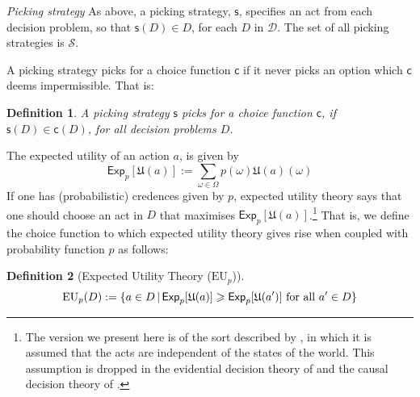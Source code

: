 \documentclass[a4paper]{article}
\newtheorem{definition}{Definition}
\newcommand\A{\mathcal{A}}
\newcommand\D{\mathcal{D}}
\renewcommand\S{\mathcal{S}}
\newcommand\s{\mathsf{s}}
\renewcommand\c{\mathsf{c}} %
\newcommand\Exp{\mathsf{Exp}}
\newcommand\EU{\mathrm{EU}}
\newcommand\U{\mathfrak{U}} %
\newcommand{\todoinfo}[2][]{\todo[backgroundcolor=orange!80,bordercolor=black,linecolor=gray!80, #1,inline,caption={}]{#2}}
\newcommand\SetDelimiter[1][]{
	\nonscript\,#1\vert \allowbreak \nonscript\,\mathopen{}}
\providecommand\given{\SetDelimiter}
\renewcommand{\emptyset}{\varnothing}
\renewcommand{\geq}{\geqslant}
\newenvironment{CCM rewritten}
{\begingroup\color{blue}} %
{\endgroup}              %
\begin{document}
\emph{Picking strategy } As above, a picking strategy, $\s$, specifies an act from each decision problem, so that $\s(D)\in D$, for each $D$ in $\D$. The set of all picking strategies is $\S$. 

A picking strategy picks for a choice function $\c$ if it never picks an option which $\c$ deems impermissible. That is: 
\begin{definition}
	A picking strategy $\s$ \emph{picks for a choice function} $\c$, if $\s(D) \in \c(D)$, for all decision problems $D$.
\end{definition}


The expected utility of an action $a$, is given by \begin{equation}
	\Exp_p [\U(a)]:=\sum_{\omega\in\Omega}p(\omega)\U(a)(\omega)
\end{equation}
If one has (probabilistic) credences given by $p$, expected utility theory says that one should choose an act in $D$ that maximises $\Exp_p[\U(a)]$.\footnote{The version we present here is of the sort described by \citet{savage1954fs}, in which it is assumed that the acts are independent of the states of the world. This assumption is dropped in the evidential decision theory of \citet{jeffrey1965lod} and the causal decision theory of \citet{stalnaker1972ldl, gibbard1978ctk, joyce1999fcdt}.} That is, we define the choice function to which expected utility theory gives rise when coupled with probability function $p$ as follows:

\begin{definition}[Expected Utility Theory ($\EU_p$)]
	\[\EU_p(D):=\{a\in D\given \Exp_p[\U(a)]\geq \Exp_p[\U(a')]\text{ for all $a'\in D$}\}\]
\end{definition}
\end{document}
